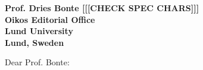 \documentclass[12pt]{letter}
\begin{document}
\begin{letter}{\bf Prof. Dries Bonte [[[CHECK SPEC CHARS]]]\\
Oikos Editorial Office \\
Lund University \\
Lund, Sweden}


\opening{Dear Prof. Bonte:}










\end{letter}
\end{document}
